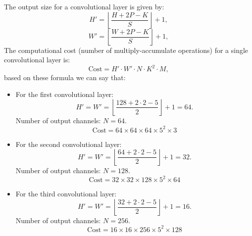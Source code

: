 \begin{qsolve}
    \begin{qsolve}[]
        The output size for a convolutional layer is given by:
        \[
        H' = \left\lfloor \frac{H + 2P - K}{S} \right\rfloor + 1,
        \]
        \[
        W' = \left\lfloor \frac{W + 2P - K}{S} \right\rfloor + 1,
        \]
        The computational cost (number of multiply-accumulate operations) for a single convolutional layer is:
        \[
        \text{Cost} = H' \cdot W' \cdot N \cdot K^2 \cdot M,
        \]
        based on these formula we can say that:
        \begin{itemize}
            \item For the first convolutional layer:
            \[
            H' = W' = \left\lfloor \frac{128 + 2 \cdot 2 - 5}{2} \right\rfloor + 1 = 64.
            \]
            Number of output channels: $N = 64$.
            \[
            \text{Cost} = 64 \times 64 \times 64 \times 5^2 \times 3 
            \]
            \item For the second convolutional layer:
            \[
            H' = W' = \left\lfloor \frac{64 + 2 \cdot 2 - 5}{2} \right\rfloor + 1 = 32.
            \]
            Number of output channels: $N = 128$.
            \[
            \text{Cost} = 32 \times 32 \times 128 \times 5^2 \times 64 
            \]
            \item For the third convolutional layer:
            \[
            H' = W' = \left\lfloor \frac{32 + 2 \cdot 2 - 5}{2} \right\rfloor + 1 = 16.
            \]
            Number of output channels: $N = 256$.
            \[
            \text{Cost} = 16 \times 16 \times 256 \times 5^2 \times 128
            \]
        \end{itemize}


\end{qsolve}
\end{qsolve}
